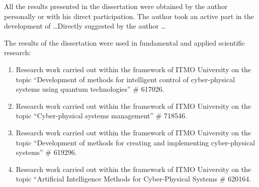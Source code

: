 {\contributionEn} All the results presented in the dissertation were obtained by the author personally or with his direct participation. The author took an active part in the development of \dots Directly suggested by the author \dots

{\implementationEn} The results of the dissertation were used in fundamental and applied scientific research:

\begin{enumerate}[beginpenalty=10000]
	\item Research work carried out within the framework of ITMO University on the topic ``Development of methods for intelligent control of cyber-physical systems using quantum technologies'' \# 617026.
	\item Research work carried out within the framework of ITMO University on the topic ``Cyber-physical systems management''  \# 718546.
	\item Research work carried out within the framework of ITMO University on the topic ``Development of methods for creating and implementing cyber-physical systems'' \# 619296.
	\item Research work carried out within the framework of ITMO University on the topic ``Artificial Intelligence Methods for Cyber-Physical Systems \# 620164.
\end{enumerate}



